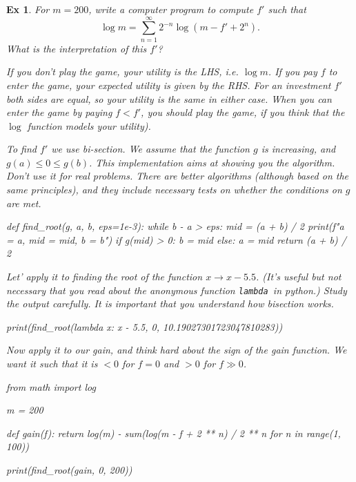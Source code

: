 \documentclass[a4paper,11pt]{article}
\newtheorem{exercise}[theorem]{Ex}
\begin{document}
\begin{exercise}
For $m=200$, write a computer program to compute $f'$ such that
\begin{equation}
  \label{eq:136}
\log m =  \sum_{n=1}^{\infty} 2^{-n}\log(m - f' + 2^{n}).
 \end{equation}
What is the interpretation of this $f'$?
\begin{solution}
  If you don't play the game, your utility is the LHS, i.e. $\log m$.
  If you pay $f$ to enter the game, your expected utility is given by the RHS.
  For an investment $f'$ both sides are equal, so your utility is the same in either case.
  When you can enter the game by paying $f<f'$, you should play the game, if you think that the $\log$ function models your utility).


  To find $f'$ we use bi-section.
  We assume that the function $g$ is increasing, and $g(a) \leq 0 \leq g(b)$.
  This implementation aims at showing you the algorithm.
  Don't use it for real problems.
  There are better algorithms (although based on the same principles), and they include necessary tests on whether the conditions on $g$ are met.

\begin{samepage}
\begin{pyblock}
def find_root(g, a, b, eps=1e-3):
    while b - a > eps:
        mid = (a + b) / 2
        print(f"a = {a}, mid = {mid}, b = {b}\n")
        if g(mid) > 0:
            b = mid
        else:
            a = mid
    return (a + b) / 2
\end{pyblock}
\end{samepage}


Let' apply it to finding the root of the function $x\to x-5.5$.
(It's useful but not necessary that you read about the anonymous function \texttt{lambda }in python.)
Study the output carefully.
It is important that you understand how bisection works.
\begin{pyblock}
print(find_root(lambda x: x - 5.5, 0, 10.19027301723047810283))
\end{pyblock}

\printpythontex

\begin{samepage}

Now apply it to our gain, and think hard about the sign of the gain function. We want it such that it is $<0$ for $f=0$ and $>0$ for $f\gg 0$.
\begin{pyblock}
from math import log

m = 200

def gain(f):
    return log(m) - sum(log(m - f + 2 ** n) / 2 ** n for n in range(1, 100))


print(find_root(gain, 0, 200))
\end{pyblock}

\end{samepage}

\printpythontex

\end{solution}
\end{exercise}
\end{document}

